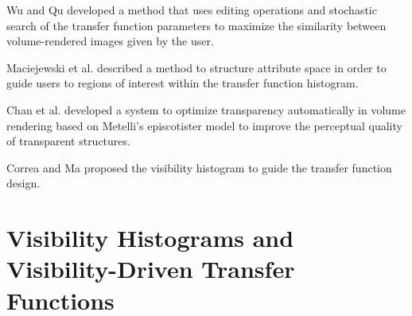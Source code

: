 \cite{tzeng_novel_2003}
\cite{tzeng_cluster-space_2004}
\cite{tzeng_intelligent_2005}

\cite{jani_opacity_2005}

Wu and Qu \cite{wu_interactive_2007} developed a method that uses editing operations and stochastic search of the transfer function parameters to maximize the similarity between volume-rendered images given by the user.

Maciejewski et al. \cite{maciejewski_structuring_2009} described a method to structure attribute space in order to guide users to regions of interest within the transfer function histogram.

Chan et al. \cite{chan_perception-based_2009} developed a system to optimize transparency automatically in volume rendering based on Metelli's episcotister model to improve the perceptual quality of transparent structures.

Correa and Ma \cite{correa_visibility-driven_2009} proposed the visibility histogram to guide the transfer function design.

\cite{wang_efficient_volume_2011}

\cite{zhou_automatic_2009}

\cite{marchesin_per-pixel_2010}

\cite{peng_optimal_2011}
\cite{lathen_automatic_2012}

\cite{woo_feature-driven_2012}

\cite{jung_opacity-driven_2014}

\cite{alper_selver_semiautomatic_2009}



\section{Visibility Histograms and Visibility-Driven Transfer Functions}

